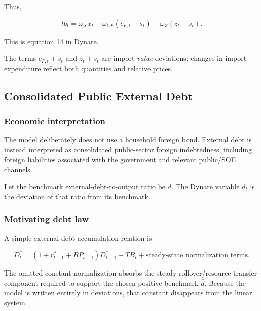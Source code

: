 Thus,

\begin{equation}
\boxed{
tb_t
=
\omega_Xx_t
-
\omega_{CF}(c_{F,t}+s_t)
-
\omega_Z(z_t+s_t).
}
\label{eq:tb_final}
\end{equation}

This is equation 14 in Dynare.

The terms \(c_{F,t}+s_t\) and \(z_t+s_t\) are import \emph{value} deviations:
changes in import expenditure reflect both quantities and relative prices.

\subsection{Consolidated Public External Debt}
\label{app:externaldebt}

\subsubsection{Economic interpretation}

The model deliberately does not use a household foreign bond. External debt is
instead interpreted as consolidated public-sector foreign indebtedness,
including foreign liabilities associated with the government and relevant
public/SOE channels.

Let the benchmark external-debt-to-output ratio be \(\bar d\). The Dynare
variable \(d_t\) is the deviation of that ratio from its benchmark.

\subsubsection{Motivating debt law}

A simple external debt accumulation relation is

\begin{equation}
D_t^{*}
=
\left(
1+r_{t-1}^{*}+RP_{t-1}
\right)
D_{t-1}^{*}
-
TB_t
+
\text{steady-state normalization terms}.
\label{eq:external_debt_nonlinear_motivation}
\end{equation}

The omitted constant normalization absorbs the steady rollover/resource-transfer
component required to support the chosen positive benchmark \(\bar d\).
Because the model is written entirely in deviations, that constant disappears
from the linear system.

